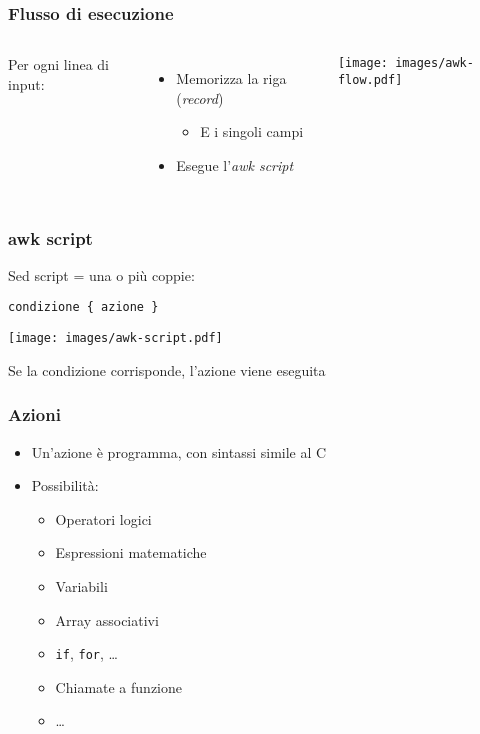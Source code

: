 \documentclass[xetex,table]{beamer}
\begin{document}
\begin{frame}
  \frametitle{Flusso di esecuzione}
  \begin{columns}
    Per ogni linea di input:
    \begin{itemize}
    \item Memorizza la riga ({\em record})
      \begin{itemize}
      \item E i singoli campi
      \end{itemize}
    \item Esegue l'{\em awk script}
    \end{itemize}
    \begin{center}
      \texttt{[image: images/awk-flow.pdf]}
    \end{center}
  \end{columns}
\end{frame}

\begin{frame}[fragile]
  \frametitle{awk script}
  Sed script = una o più coppie:
  \begin{verbatim}
condizione { azione }
  \end{verbatim}
    \begin{center}
      \texttt{[image: images/awk-script.pdf]}
    \end{center}
    Se la condizione corrisponde, l'azione viene eseguita
\end{frame}

\begin{frame}
  \frametitle{Azioni}
  \begin{itemize}
  \item Un'azione è programma, con sintassi simile al C
  \item Possibilità:
    \begin{itemize}
    \item Operatori logici
    \item Espressioni matematiche
    \item Variabili
    \item Array associativi
    \item \texttt{if}, \texttt{for}, \dots
    \item Chiamate a funzione
    \item\dots
    \end{itemize}
  \end{itemize}
\end{frame}
\end{document}
